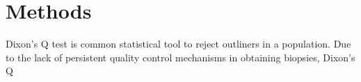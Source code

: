 \chapter{Methods}

Dixon's Q test is common statistical tool to reject outliners in a population. Due to the lack of persistent quality control mechanisms in obtaining biopsies, Dixon's Q 
